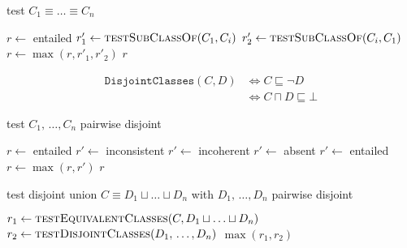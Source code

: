 \documentclass[paper.tex]{subfiles}
\begin{document}
\begin{algorithm}[H]
  \caption{test $C_1 \equiv \ldots \equiv C_n$}
  \begin{algorithmic}[1]
    \raggedright
      \State $r \gets$ entailed
        \State $r'_1 \gets \Call{testSubClassOf}{C_1, C_i}$
        \State $r'_2 \gets \Call{testSubClassOf}{C_i, C_1}$
        \State $r \gets \max(r, r'_1, r'_2)$
      \EndFor
      \State \Return $r$
    \EndFunction
  \end{algorithmic}
\end{algorithm}


\begin{align*}
  \mathtt{DisjointClasses}(C, D)
  &\iff C \sqsubseteq \neg D \\
  &\iff C \sqcap D \sqsubseteq \bot
\end{align*}


\begin{algorithm}[H]
  \caption{test $C_1, \,\ldots, C_n$ pairwise disjoint}
  \begin{algorithmic}[1]
    \raggedright
      \State $r \gets$ entailed
            \State $r' \gets$ inconsistent
            \State $r' \gets$ incoherent
            \State $r' \gets$ absent
          \Else
            \State $r' \gets$ entailed
          \EndIf
          \State $r \gets \max(r, r')$
        \EndFor
      \EndFor
      \State \Return $r$
    \EndFunction
  \end{algorithmic}
\end{algorithm}

\begin{algorithm}[H]
  \caption{test disjoint union $C \equiv D_1 \sqcup \ldots \sqcup D_n$ with $D_1, \,\ldots, D_n$ pairwise disjoint}
  \begin{algorithmic}[1]
    \raggedright
      \State $r_1 \gets \Call{testEquivalentClasses}{C, D_1 \sqcup \ldots \sqcup D_n}$
      \State $r_2 \gets \Call{testDisjointClasses}{D_1, \,\ldots, D_n}$
      \State \Return $\max(r_1, r_2)$
    \EndFunction
  \end{algorithmic}
\end{algorithm}
\end{document}
